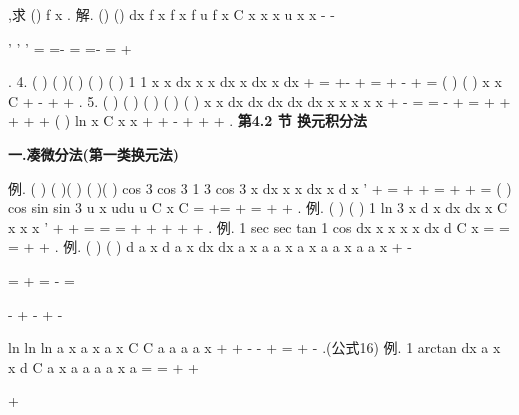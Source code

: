 ,求
()
f x . 
解.
()
()
dx
f
x
f
x
f
u
f x
C
x
x
x
u
x
x
-
-





'
'
'
\cdots 
=
\Rightarrow 
=-
\Rightarrow 
=
\Rightarrow 
=-
=
+










\int 
. 
4.
(
)
(
)(
)
(
)
(
)
1 1
x x
dx
x
x
dx
x
dx
x
dx
+
=
+-
+
=
+
-
+
=
\int 
\int 
\int 
\int 
(
)
(
)
x
x
C
+
-
+
+
. 
5.
(
)
(
)
(
)
(
)
(
)
x
x
dx
dx
dx
dx
dx
x
x
x
x
x
+
-
=
=
-
+
=
+
+
+
+
+
\int 
\int 
\int 
\int 
\int 
(
)
ln
x
C
x
x
+
+
-
+
+
+
. 
\vspace{6pt}
{\large \bfseries \textcolor{lyred}{第4.2 节 换元积分法}}

\vspace{4pt}
{\bfseries \textcolor{lyred}{一.凑微分法(第一类换元法)}}

\textcolor{lyred}{例}.
(
)
(
)(
)
(
)(
)
cos 3
cos 3
1 3
cos 3
x
dx
x
x
dx
x
d
x
'
+
=
+
+
=
+
+
=
\int 
\int 
\int 
(
)
cos
sin
sin 3
u
x
udu
u
C
x
C
=
+=
+
=
+
+
\int 
. 
\textcolor{lyred}{例}.
(
)
(
)
1 ln 3
x
d
x
dx
dx
x
C
x
x
x
'
+
+
=
=
=
+
+
+
+
+
\int 
\int 
\int 
. 
\textcolor{lyred}{例}.
1 sec
sec
tan
1 cos
dx
x
x
x
x
dx
d
C
x =
=
=
+
+
\int 
\int 
\int 
. 
\textcolor{lyred}{例}.
(
)
(
)
d a
x
d a
x
dx
dx
a
x
a
a
x
a
x
a
a
x
a
a
x
+
-


=
+
=
-
=


-
+
-
+
-


\int 
\int 
\int 
\int 
ln
ln
ln
a
x
a
x
a
x
C
C
a
a
a
a
x
+
+
-
-
+
=
+
-
.(公式16) 
\textcolor{lyred}{例}.
1 arctan
dx
a
x
x
d
C
a
x
a
a
a
a
x
a
=
=
+
+


+



